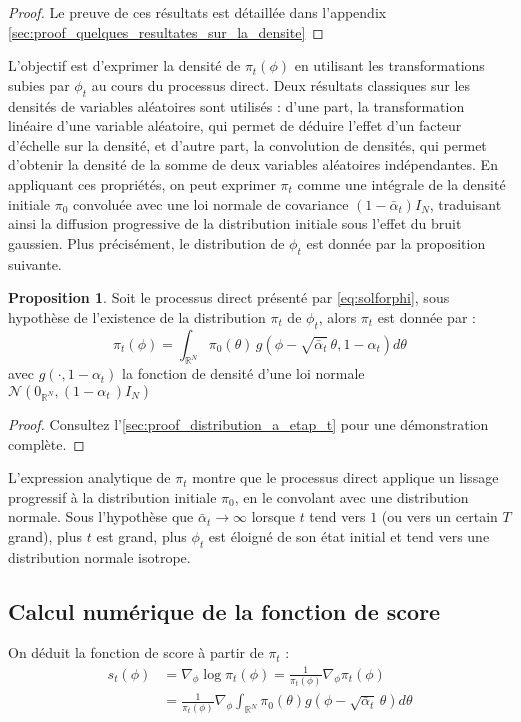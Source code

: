 \documentclass[a4paper,10pt]{article}
\theoremstyle{definition} %
\theoremstyle{definition} %
\newtheorem{proposition}[definition]{Proposition}
\theoremstyle{definition} %
\theoremstyle{definition} %
\newcommand{\R}{\mathbb{R}}
\begin{document}
\begin{proof}
    Le preuve de ces résultats est détaillée dans l'appendix \cref{sec:proof_quelques_resultates_sur_la_densite}
\end{proof}

L’objectif est d’exprimer la densité de \(\pi_t(\phi)\) en utilisant les transformations subies par \(\phi_t\) au cours du processus direct. Deux résultats classiques sur les densités de variables aléatoires sont utilisés : d’une part, la transformation linéaire d’une variable aléatoire, qui permet de déduire l’effet d’un facteur d’échelle sur la densité, et d’autre part, la convolution de densités, qui permet d’obtenir la densité de la somme de deux variables aléatoires indépendantes. En appliquant ces propriétés, on peut exprimer \(\pi_t\) comme une intégrale de la densité initiale \(\pi_0\) convoluée avec une loi normale de covariance \((1 - \bar{\alpha}_t) I_N\), traduisant ainsi la diffusion progressive de la distribution initiale sous l’effet du bruit gaussien. Plus précisément, le distribution de $\phi_t$ est donnée par la proposition suivante.

\begin{proposition}\label{prop:distribution_a_etap_t}
    Soit le processus direct présenté par \cref{eq:solforphi}, sous hypothèse de l'existence de la distribution $\pi_t$ de $\phi_t$, alors $\pi_t$ est donnée par :
    \begin{equation}\label{eq:distribution_pi_t}
        \pi_t(\phi) = \int_{\R^N} \pi_0(\theta)\, g(\phi - \sqrt{\bar \alpha_t}\,\theta, 1- \alpha_t) d\theta
    \end{equation}
    avec $g(\cdot, 1-\alpha_t)$ la fonction de densité d'une loi normale $\mathcal{N}\left(0_{\R^N}, (1- \alpha _t \,)I_N\right)$
\end{proposition}

\begin{proof}
    Consultez l'\cref{sec:proof_distribution_a_etap_t} pour une démonstration complète.
\end{proof}

L'expression analytique de $\pi_t$ montre que le processus direct applique un lissage progressif à la distribution initiale $\pi_0$, en le convolant avec une distribution normale. Sous l'hypothèse que $\bar \alpha_t \rightarrow \infty$ lorsque $t$ tend vers $1$ (ou vers un certain $T$ grand), plus $t$ est grand, plus $\phi_t$ est éloigné de son état initial et tend vers une distribution normale isotrope.
\subsection{Calcul numérique de la fonction de score}
On déduit la fonction de score à partir de $\pi_t$ :
\begin{align*}
        s_t(\phi) &= \nabla_\phi \log \pi_t(\phi) = \frac{1}{\pi_t(\phi)}\nabla_\phi\pi_t(\phi) \\
        &= \frac{1}{\pi_t(\phi)}\nabla_\phi\int_{\R^N} \pi_0(\theta) g(\phi - \sqrt{\bar \alpha_t} \,\theta) d\theta\\
\end{align*}
\end{document}
